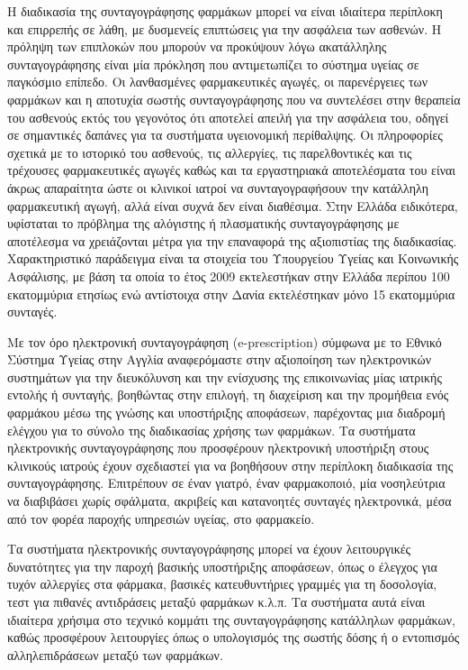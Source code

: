 		Η διαδικασία της συνταγογράφησης φαρμάκων μπορεί να είναι ιδιαίτερα περίπλοκη και επιρρεπής σε λάθη, με
δυσμενείς επιπτώσεις για την ασφάλεια των ασθενών. Η πρόληψη των επιπλοκών που μπορούν να προκύψουν λόγω ακατάλληλης συνταγογράφησης είναι μία πρόκληση που αντιμετωπίζει το σύστημα υγείας σε παγκόσμιο επίπεδο. Οι λανθασμένες φαρμακευτικές αγωγές, οι παρενέργειες των φαρμάκων και η αποτυχία σωστής συνταγογράφησης που να συντελέσει στην θεραπεία του ασθενούς εκτός του γεγονότος ότι αποτελεί απειλή για την ασφάλεια του, οδηγεί σε σημαντικές δαπάνες για τα συστήματα υγειονομική περίθαλψης. Οι πληροφορίες σχετικά με το ιστορικό του ασθενούς, τις αλλεργίες, τις παρελθοντικές και τις τρέχουσες φαρμακευτικές αγωγές καθώς και τα εργαστηριακά αποτελέσματα του είναι άκρως απαραίτητα ώστε οι κλινικοί ιατροί να συνταγογραφήσουν την κατάλληλη φαρμακευτική αγωγή, αλλά είναι συχνά δεν είναι διαθέσιμα. \cite{prescribingErrors} Στην Ελλάδα ειδικότερα, υφίσταται το πρόβλημα της αλόγιστης ή πλασματικής συνταγογράφησης με αποτέλεσμα να  χρειάζονται μέτρα για την επαναφορά της αξιοπιστίας της διαδικασίας.  Χαρακτηριστικό παράδειγμα είναι τα στοιχεία του Υπουργείου Υγείας και Κοινωνικής Ασφάλισης, με βάση τα οποία το έτος 2009 εκτελεστήκαν στην Ελλάδα περίπου 100 εκατομμύρια ετησίως ενώ αντίστοιχα στην Δανία εκτελέστηκαν μόνο 15 εκατομμύρια συνταγές.


		Με τον όρο ηλεκτρονική συνταγογράφηση (e-prescription) σύμφωνα με το Εθνικό Σύστημα Υγείας στην Αγγλία αναφερόμαστε στην αξιοποίηση των ηλεκτρονικών συστημάτων για την διευκόλυνση και την ενίσχυσης της επικοινωνίας μίας ιατρικής εντολής ή συνταγής, βοηθώντας στην επιλογή, τη διαχείριση και την προμήθεια ενός φαρμάκου μέσω της γνώσης και υποστήριξης αποφάσεων, παρέχοντας μια διαδρομή ελέγχου για το σύνολο της διαδικασίας χρήσης των φαρμάκων.  Τα συστήματα ηλεκτρονικής συνταγογράφησης που προσφέρουν ηλεκτρονική υποστήριξη στους κλινικούς ιατρούς έχουν σχεδιαστεί για να βοηθήσουν στην περίπλοκη διαδικασία της συνταγογράφησης. \cite{Kierkegaard2013} Επιτρέπουν σε έναν γιατρό, έναν φαρμακοποιό, μία νοσηλεύτρια να διαβιβάσει χωρίς σφάλματα, ακριβείς και κατανοητές συνταγές ηλεκτρονικά, μέσα από τον φορέα παροχής υπηρεσιών υγείας, στο φαρμακείο.  \cite{eprescr}
		
		
		Τα συστήματα ηλεκτρονικής συνταγογράφησης μπορεί να έχουν λειτουργικές δυνατότητες για την παροχή βασικής υποστήριξης αποφάσεων, όπως ο έλεγχος για τυχόν αλλεργίες στα φάρμακα, βασικές κατευθυντήριες γραμμές για τη δοσολογία, τεστ για πιθανές αντιδράσεις μεταξύ φαρμάκων κ.λ.π. Τα συστήματα αυτά είναι ιδιαίτερα χρήσιμα στο τεχνικό κομμάτι της συνταγογράφησης κατάλληλων φαρμάκων, καθώς προσφέρουν λειτουργίες όπως ο υπολογισμός της σωστής δόσης ή ο εντοπισμός αλληλεπιδράσεων μεταξύ των φαρμάκων. \cite{Kart2008}

